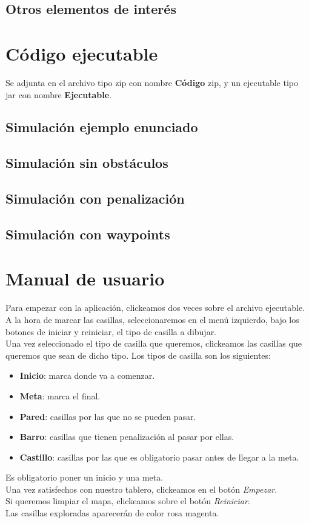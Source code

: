 \documentclass[12pt]{article}
\begin{document}
\subsection{Otros elementos de interés}

\section{Código ejecutable}
Se adjunta en el archivo tipo zip con nombre \textbf{Código} zip, y un ejecutable tipo jar con nombre \textbf{Ejecutable}.
\subsection{Simulación ejemplo enunciado}
\subsection{Simulación sin obstáculos}
\subsection{Simulación con penalización}
\subsection{Simulación con waypoints}

\section{Manual de usuario}
Para empezar con la aplicación, clickeamos dos veces sobre el archivo ejecutable.\\
A la hora de marcar las casillas, seleccionaremos en el menú izquierdo, bajo los botones de iniciar y reiniciar, el tipo de casilla a dibujar.\\
Una vez seleccionado el tipo de casilla que queremos, clickeamos las casillas que queremos que sean de dicho tipo. Los tipos de casilla son los siguientes:\\
\begin{itemize}
    \item \textbf{Inicio}: marca donde va a comenzar.
    \item \textbf{Meta}: marca el final.
    \item \textbf{Pared}: casillas por las que no se pueden pasar.
    \item \textbf{Barro}: casillas que tienen penalización al pasar por ellas.
    \item \textbf{Castillo}: casillas por las que es obligatorio pasar antes de llegar a la meta.
\end{itemize}
Es obligatorio poner un inicio y una meta.\\
Una vez satisfechos con nuestro tablero, clickeamos en el botón \textit{Empezar}.\\
Si queremos limpiar el mapa, clickeamos sobre el botón \textit{Reiniciar}.\\
Las casillas exploradas aparecerán de color rosa magenta.
\end{document}

